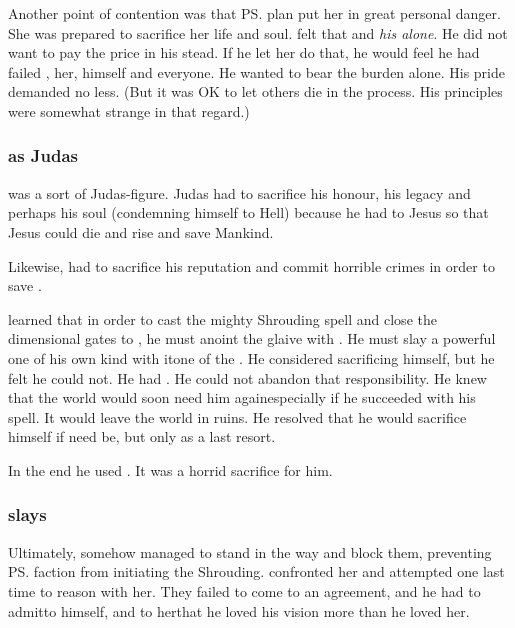 Another point of contention was that \ps{\Rystessakhin} plan put her in great personal danger. 
She was prepared to sacrifice her life and soul. 
\Ishnaruchaefir{} felt that  and \emph{his alone}. 
He did not want \Rystessakhin{} to pay the price in his stead. 
If he let her do that, he would feel he had failed \Nexagglachel, her, himself and everyone. 
He wanted to bear the burden alone. 
His pride demanded no less. 
(But it was OK to let others die in the process. 
His principles were somewhat strange in that regard.)





\subsubsection{\Ishnaruchaefir as Judas}
\Ishnaruchaefir was a sort of Judas-figure. 
Judas had to sacrifice his honour, his legacy and perhaps his soul (condemning himself to Hell) because he had to  Jesus so that Jesus could die and rise and save Mankind. 

Likewise, \Ishnaruchaefir had to sacrifice his reputation and commit horrible crimes in order to save \Dragonkind. 

\Iscrafel learned that in order to cast the mighty Shrouding spell and close the dimensional gates to \Erebos, he must anoint the glaive with . 
He must slay a powerful one of his own kind with it\dash{}one of the . 
He considered sacrificing himself, but he felt he could not.
He had . 
He could not abandon that responsibility. 
He knew that the world would soon need him again\dash{}especially if he succeeded with his spell.
It would leave the world in ruins. 
He resolved that he would sacrifice himself if need be, but only as a last resort. 

In the end he used \Rystessakhin. 
It was a horrid sacrifice for him. 





\subsubsection{\Ishnaruchaefir{} slays \Rystessakhin}
Ultimately, \Rystessakhin{} somehow managed to stand in the way and block them, preventing \ps{\Ishnaruchaefir} faction from initiating the Shrouding. 
\Ishnaruchaefir{} confronted her and attempted one last time to reason with her. 
They failed to come to an agreement, and he had to admit\dash to himself, and to her\dash that he loved his vision more than he loved her. 


